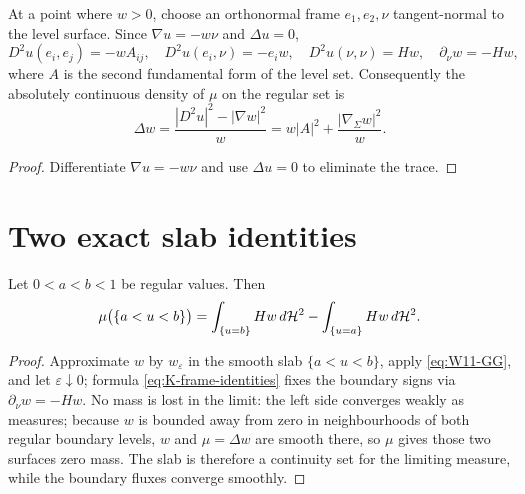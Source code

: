 \begin{lemma}\label{lem:K-level-identities}
At a point where $w>0$, choose an orthonormal frame $e_1,e_2,\nu$ tangent-normal
to the level surface.  Since $\nabla u=-w\nu$ and $\Delta u=0$,
\begin{equation}\label{eq:K-frame-identities}
  D^2u(e_i,e_j)=-wA_{ij},\quad
  D^2u(e_i,\nu)=-e_iw,\quad
  D^2u(\nu,\nu)=Hw,\quad
  \partial_\nu w=-Hw ,
\end{equation}
where $A$ is the second fundamental form of the level set.  Consequently the
absolutely continuous density of $\mu$ on the regular set is
\begin{equation}\label{eq:K-density}
  \Delta w=\frac{|D^2u|^2-|\nabla w|^2}{w}
  =w|A|^2+\frac{|\nabla_\Sigma w|^2}{w}.
\end{equation}
\end{lemma}

\begin{proof}
Differentiate $\nabla u=-w\nu$ and use $\Delta u=0$ to eliminate the trace.
\end{proof}

\section{Two exact slab identities}

\begin{lemma}\label{lem:K-slab-H}
Let $0<a<b<1$ be regular values.  Then
\begin{equation}\label{eq:K-slab-H}
  \mu\bigl(\{a<u<b\}\bigr)
  =\int_{\{u=b\}}Hw\,d\mathcal H^2-\int_{\{u=a\}}Hw\,d\mathcal H^2 .
\end{equation}
\end{lemma}

\begin{proof}
Approximate $w$ by $w_\varepsilon$ in the smooth slab $\{a<u<b\}$, apply
\eqref{eq:W11-GG}, and let $\varepsilon\downarrow0$; formula
\eqref{eq:K-frame-identities} fixes the boundary signs via
$\partial_\nu w=-Hw$.  No mass is lost in the limit: the left side converges
weakly as measures; because $w$ is bounded away from zero in neighbourhoods
of both regular boundary levels, $w$ and $\mu=\Delta w$ are smooth there, so
$\mu$ gives those two surfaces zero mass.  The slab is therefore a continuity
set for the limiting measure, while the boundary fluxes converge smoothly.
\end{proof}

